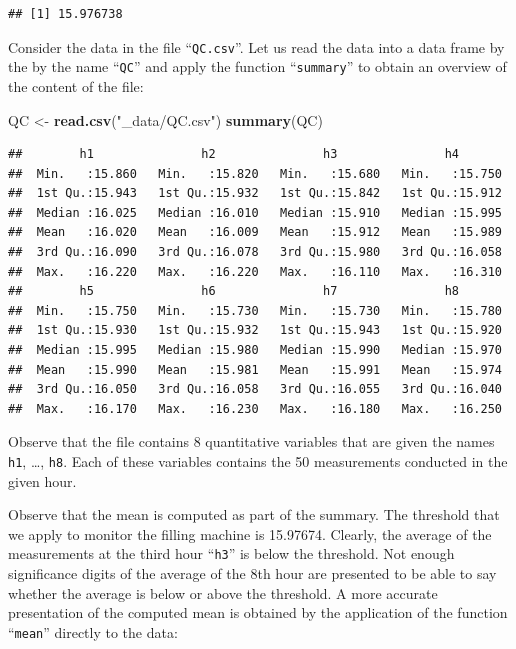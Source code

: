 \documentclass[]{krantz}
\makeatletter
\newenvironment{Shaded}{\begin{snugshade}}{\end{snugshade}}
\newcommand{\KeywordTok}[1]{\textcolor[rgb]{0.13,0.29,0.53}{\textbf{#1}}}
\newcommand{\StringTok}[1]{\textcolor[rgb]{0.31,0.60,0.02}{#1}}
\newcommand{\NormalTok}[1]{#1}
\newenvironment{kframe}{%
\medskip{}
\setlength{\fboxsep}{.8em}
 \def\at@end@of@kframe{}%
 \ifinner\ifhmode%
  \def\at@end@of@kframe{\end{minipage}}%
  \begin{minipage}{\columnwidth}%
 \fi\fi%
 \def\FrameCommand##1{\hskip\@totalleftmargin \hskip-\fboxsep
 \colorbox{shadecolor}{##1}\hskip-\fboxsep
     \hskip-\linewidth \hskip-\@totalleftmargin \hskip\columnwidth}%
 \MakeFramed {\advance\hsize-\width
   \@totalleftmargin\z@ \linewidth\hsize
   \@setminipage}}%
 {\par\unskip\endMakeFramed%
 \at@end@of@kframe}
\renewenvironment{Shaded}{\begin{kframe}}{\end{kframe}}
\theoremstyle{definition}
\theoremstyle{definition}
\theoremstyle{definition}
\theoremstyle{remark}
\makeatother
\begin{document}
\begin{verbatim}
## [1] 15.976738
\end{verbatim}

Consider the data in the file ``\texttt{QC.csv}''. Let us read the data
into a data frame by the by the name ``\texttt{QC}'' and apply the
function ``\texttt{summary}'' to obtain an overview of the content of
the file:

\begin{Shaded}
\begin{Highlighting}[]
\NormalTok{QC <-}\StringTok{ }\KeywordTok{read.csv}\NormalTok{(}\StringTok{"_data/QC.csv"}\NormalTok{)}
\KeywordTok{summary}\NormalTok{(QC)}
\end{Highlighting}
\end{Shaded}

\begin{verbatim}
##        h1               h2               h3               h4        
##  Min.   :15.860   Min.   :15.820   Min.   :15.680   Min.   :15.750  
##  1st Qu.:15.943   1st Qu.:15.932   1st Qu.:15.842   1st Qu.:15.912  
##  Median :16.025   Median :16.010   Median :15.910   Median :15.995  
##  Mean   :16.020   Mean   :16.009   Mean   :15.912   Mean   :15.989  
##  3rd Qu.:16.090   3rd Qu.:16.078   3rd Qu.:15.980   3rd Qu.:16.058  
##  Max.   :16.220   Max.   :16.220   Max.   :16.110   Max.   :16.310  
##        h5               h6               h7               h8        
##  Min.   :15.750   Min.   :15.730   Min.   :15.730   Min.   :15.780  
##  1st Qu.:15.930   1st Qu.:15.932   1st Qu.:15.943   1st Qu.:15.920  
##  Median :15.995   Median :15.980   Median :15.990   Median :15.970  
##  Mean   :15.990   Mean   :15.981   Mean   :15.991   Mean   :15.974  
##  3rd Qu.:16.050   3rd Qu.:16.058   3rd Qu.:16.055   3rd Qu.:16.040  
##  Max.   :16.170   Max.   :16.230   Max.   :16.180   Max.   :16.250
\end{verbatim}

Observe that the file contains 8 quantitative variables that are given
the names \texttt{h1}, \ldots{}, \texttt{h8}. Each of these variables
contains the 50 measurements conducted in the given hour.

Observe that the mean is computed as part of the summary. The threshold
that we apply to monitor the filling machine is 15.97674. Clearly, the
average of the measurements at the third hour ``\texttt{h3}'' is below
the threshold. Not enough significance digits of the average of the 8th
hour are presented to be able to say whether the average is below or
above the threshold. A more accurate presentation of the computed mean
is obtained by the application of the function ``\texttt{mean}''
directly to the data:
\end{document}
